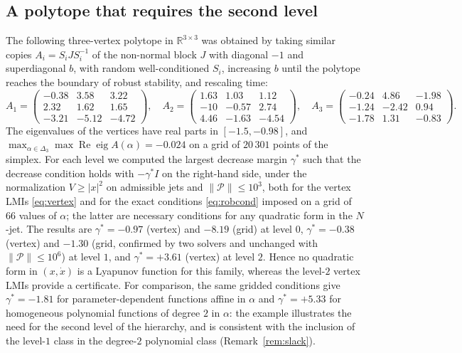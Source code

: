 \documentclass[preprint,12pt,authoryear]{elsarticle}
\theoremstyle{definition}
\theoremstyle{remark}
\newcommand{\R}{\mathbb{R}}
\newcommand{\PP}{\mathcal{P}}
\begin{document}
\subsection{A polytope that requires the second level}\label{sec:numlevel2}
The following three-vertex polytope in $\R^{3\times3}$ was obtained by taking similar copies $A_i=S_iJS_i^{-1}$ of the non-normal block $J$ with diagonal $-1$ and superdiagonal $b$, with random well-conditioned $S_i$, increasing $b$ until the polytope reaches the boundary of robust stability, and rescaling time:
\begin{equation}\label{eq:ex2}
A_1=\begin{pmatrix}-0.38&3.58&3.22\\2.32&1.62&1.65\\-3.21&-5.12&-4.72\end{pmatrix},\quad
A_2=\begin{pmatrix}1.63&1.03&1.12\\-10&-0.57&2.74\\4.46&-1.63&-4.54\end{pmatrix},\quad
A_3=\begin{pmatrix}-0.24&4.86&-1.98\\-1.24&-2.42&0.94\\-1.78&1.31&-0.83\end{pmatrix}.
\end{equation}
The eigenvalues of the vertices have real parts in $[-1.5,-0.98]$, and $\max_{\alpha\in\Delta_3}\max\operatorname{Re}\operatorname{eig}A(\alpha)=-0.024$ on a grid of $20\,301$ points of the simplex. For each level we computed the largest decrease margin $\gamma^*$ such that the decrease condition holds with $-\gamma^*I$ on the right-hand side, under the normalization $V\ge|x|^2$ on admissible jets and $\|\PP\|\le10^3$, both for the vertex LMIs \eqref{eq:vertex} and for the exact conditions \eqref{eq:robcond} imposed on a grid of $66$ values of $\alpha$; the latter are necessary conditions for any quadratic form in the $N$-jet. The results are $\gamma^*=-0.97$ (vertex) and $-8.19$ (grid) at level $0$, $\gamma^*=-0.38$ (vertex) and $-1.30$ (grid, confirmed by two solvers and unchanged with $\|\PP\|\le10^6$) at level $1$, and $\gamma^*=+3.61$ (vertex) at level $2$. Hence no quadratic form in $(x,\dot x)$ is a Lyapunov function for this family, whereas the level-$2$ vertex LMIs provide a certificate. For comparison, the same gridded conditions give $\gamma^*=-1.81$ for parameter-dependent functions affine in $\alpha$ and $\gamma^*=+5.33$ for homogeneous polynomial functions of degree $2$ in $\alpha$: the example illustrates the need for the second level of the hierarchy, and is consistent with the inclusion of the level-$1$ class in the degree-$2$ polynomial class (Remark~\ref{rem:slack}).
\end{document}
